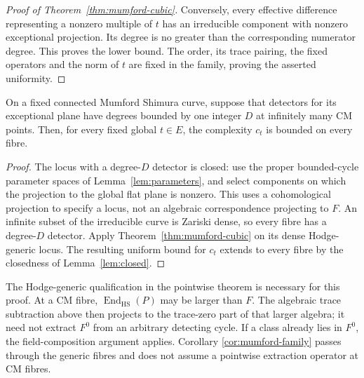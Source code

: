 \begin{proof}[Proof of Theorem~\ref{thm:mumford-cubic}]
Conversely, every effective difference representing a nonzero
multiple of $t$ has an irreducible component with nonzero
exceptional projection. Its degree is no greater than the
corresponding numerator degree. This proves the lower bound.
The order, its trace pairing, the fixed operators and the norm of
$t$ are fixed in the family, proving the asserted uniformity.
\end{proof}

\begin{corollary}\label{cor:mumford-family}
On a fixed connected Mumford Shimura curve, suppose that detectors
for its exceptional plane have degrees bounded by one integer $D$
at infinitely many CM points. Then, for every fixed global
$t\in E$, the complexity $c_t$ is bounded on every fibre.
\end{corollary}

\begin{proof}
The locus with a degree-$D$ detector is closed: use the proper
bounded-cycle parameter spaces of Lemma~\ref{lem:parameters}, and
select components on which the projection to the global flat plane
is nonzero. This uses a cohomological projection to specify a
locus, not an algebraic correspondence projecting to $F$.
An infinite subset of the irreducible curve is Zariski dense, so
every fibre has a degree-$D$ detector. Apply
Theorem~\ref{thm:mumford-cubic} on its dense Hodge-generic locus.
The resulting uniform bound for $c_t$ extends to every fibre by
the closedness of Lemma~\ref{lem:closed}.
\end{proof}

The Hodge-generic qualification in the pointwise theorem is necessary
for this proof. At a CM fibre,
$\operatorname{End}_{\mathrm{HS}}(P)$ may be larger than $F$.
The algebraic trace subtraction above then projects to the
trace-zero part of that larger algebra; it need not extract $F^0$
from an arbitrary detecting cycle. If a class already lies in
$F^0$, the field-composition argument applies. Corollary
\ref{cor:mumford-family} passes through the generic fibres and does
not assume a pointwise extraction operator at CM fibres.

